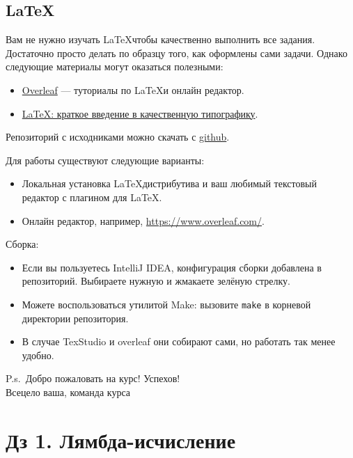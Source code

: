\documentclass{article}
\begin{document}
    \subsection*{\LaTeX}

    Вам не нужно изучать \LaTeX чтобы качественно выполнить все задания.
    Достаточно просто делать по образцу того, как оформлены сами задачи.
    Однако следующие материалы могут оказаться полезными:

    \begin{itemize}
        \item \href{https://www.overleaf.com/learn}{Overleaf} --- туториалы по \LaTeX и онлайн редактор.
        \item \href{https://youtu.be/NOslSvJs29I}{LaTeX: краткое введение в качественную типографику}.
    \end{itemize}

    Репозиторий с исходниками можно скачать с \href{https://github.com/mse-fp2023/calculus-hws}{github}.

    Для работы существуют следующие варианты:
    \begin{itemize}
        \item Локальная установка \LaTeX дистрибутива и ваш любимый текстовый редактор с плагином для \LaTeX.
        \item Онлайн редактор, например, \url{https://www.overleaf.com/}.
    \end{itemize}

    Сборка:
    \begin{itemize}
        \item Если вы пользуетесь IntelliJ IDEA, конфигурация сборки добавлена в репозиторий.
        Выбираете нужную и жмакаете зелёную стрелку.
        \item Можете воспользоваться утилитой Make: вызовите \texttt{make} в корневой директории репозитория.
        \item В случае TexStudio и overleaf они собирают сами, но работать так менее удобно.
    \end{itemize}

    \begin{flushright}
        P.s.\ Добро пожаловать на курс!
        Успехов! \\
        Всецело ваша, команда курса
    \end{flushright}

    \newpage


    \section*{Дз 1. Лямбда-исчисление}
\end{document}
